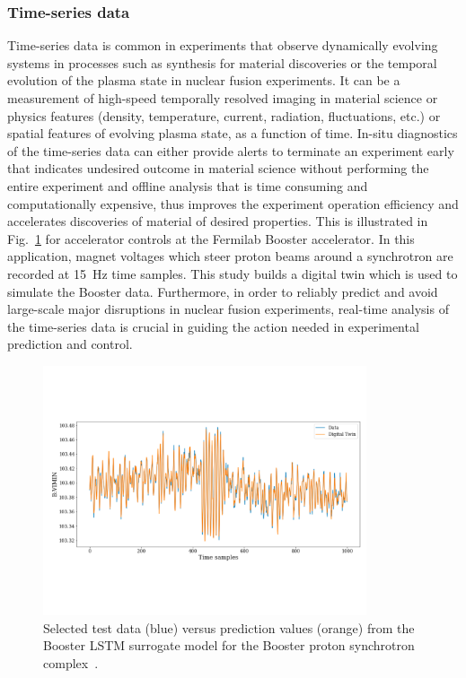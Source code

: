 \subsubsection{Time-series data}
Time-series data is common in experiments that observe dynamically evolving systems in processes such as synthesis for material discoveries or the temporal evolution of the plasma state in nuclear fusion experiments. 
It can be a measurement of high-speed temporally resolved imaging in material science or physics features (density, temperature, current, radiation, fluctuations, etc.) or spatial features of evolving plasma state, as a function of time. 
In-situ diagnostics of the time-series data can either provide alerts to terminate an experiment early that indicates undesired outcome in material science without performing the entire experiment and offline analysis that is time consuming and computationally expensive, thus improves the experiment operation efficiency and accelerates discoveries of material of desired properties. 
This is illustrated in Fig.~\ref{fig:reptime} for accelerator controls at the Fermilab Booster accelerator.  
In this application, magnet voltages which steer proton beams around a synchrotron are recorded at 15~Hz time samples.  
This study builds a digital twin which is used to simulate the Booster data. 
Furthermore, in order to reliably predict and avoid large-scale major disruptions in nuclear fusion experiments, real-time analysis of the time-series data is crucial in guiding the action needed in experimental prediction and control.

 \begin{figure}[tbh!]
     \centering
     \includegraphics[width = 0.85\textwidth]{figures/Booster.pdf}
     \caption{Selected test data (blue) versus prediction values (orange) from the Booster LSTM surrogate model for the Booster proton synchrotron complex~\cite{John:2020sak}.}
     \label{fig:reptime}
 \end{figure}
 
